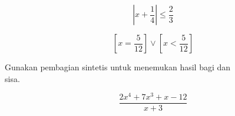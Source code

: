 \documentclass[a4paper,10pt]{article}
\begin{document}
\begin{eulernotebook}
\begin{eulercomment}
\begin{eulercomment}
\begin{eulercomment}
\end{eulercomment}
\begin{eulerformula}
\[
\left|x+\frac{1}{4}\right|\leq\frac{2}{3}
\]
\end{eulerformula}
\begin{eulerformula}
\[
\left[ x=\frac{5}{12} \right] \lor \left[ x<\frac{5}{12} \right] 
\]
\end{eulerformula}
\begin{eulercomment}
Gunakan pembagian sintetis untuk menemukan hasil bagi dan\\
sisa.\\
\end{eulercomment}
\begin{eulerformula}
\[
\frac{2x^4 + 7x^3 + x - 12}{x + 3}
\]
\end{eulerformula}
\begin{eulerttcomment}
 

\end{eulerttcomment}
\end{eulercomment}
\end{eulercomment}
\end{eulernotebook}
\end{document}
